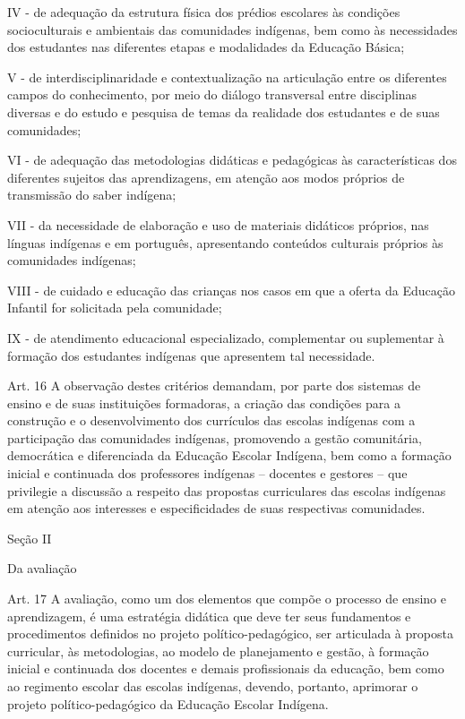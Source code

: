 \documentclass[
]{book}
\begin{document}
IV - de adequação da estrutura física dos prédios escolares às condições socioculturais e ambientais das comunidades indígenas, bem como às necessidades dos estudantes nas diferentes etapas e modalidades da Educação Básica;

V - de interdisciplinaridade e contextualização na articulação entre os diferentes campos do conhecimento, por meio do diálogo transversal entre disciplinas diversas e do estudo e pesquisa de temas da realidade dos estudantes e de suas comunidades;

VI - de adequação das metodologias didáticas e pedagógicas às características dos diferentes sujeitos das aprendizagens, em atenção aos modos próprios de transmissão do saber indígena;

VII - da necessidade de elaboração e uso de materiais didáticos próprios, nas línguas indígenas e em português, apresentando conteúdos culturais próprios às comunidades indígenas;

VIII - de cuidado e educação das crianças nos casos em que a oferta da Educação Infantil for solicitada pela comunidade;

IX - de atendimento educacional especializado, complementar ou suplementar à formação dos estudantes indígenas que apresentem tal necessidade.

Art. 16 A observação destes critérios demandam, por parte dos sistemas de ensino e de suas instituições formadoras, a criação das condições para a construção e o desenvolvimento dos currículos das escolas indígenas com a participação das comunidades indígenas, promovendo a gestão comunitária, democrática e diferenciada da Educação Escolar Indígena, bem como a formação inicial e continuada dos professores indígenas -- docentes e gestores -- que privilegie a discussão a respeito das propostas curriculares das escolas indígenas em atenção aos interesses e especificidades de suas respectivas comunidades.

Seção II

Da avaliação

Art. 17 A avaliação, como um dos elementos que compõe o processo de ensino e aprendizagem, é uma estratégia didática que deve ter seus fundamentos e procedimentos definidos no projeto político-pedagógico, ser articulada à proposta curricular, às metodologias, ao modelo de planejamento e gestão, à formação inicial e continuada dos docentes e demais profissionais da educação, bem como ao regimento escolar das escolas indígenas, devendo, portanto, aprimorar o projeto político-pedagógico da Educação Escolar Indígena.
\end{document}
